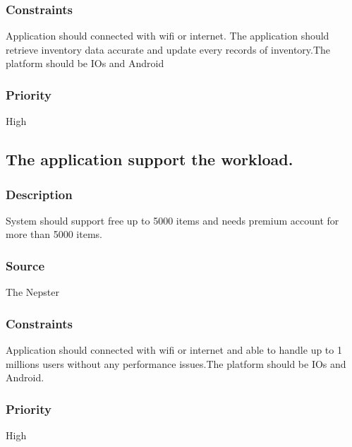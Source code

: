 \subsubsection{Constraints}
Application should connected with wifi or internet. The application should retrieve inventory data accurate and update every records of inventory.The platform should be IOs and Android 
\subsubsection{Priority}
High
\subsection{The application support the workload.}
\subsubsection{Description}
System should support free up to 5000 items and needs premium account for more than 5000 items.
\subsubsection{Source}
The Nepster
\subsubsection{Constraints}
Application should connected with wifi or internet and able to handle up to 1 millions users without any performance issues.The platform should be IOs and Android.
\subsubsection{Priority}
High